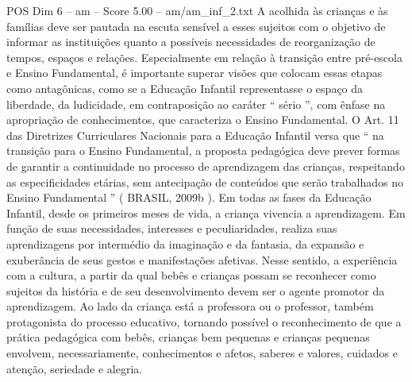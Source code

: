 \begin{textsample}{POS Dim 6 – am – Score 5.00 – am/am\_inf\_2.txt}
A acolhida às crianças e às famílias deve ser pautada na escuta sensível a esses sujeitos com o objetivo de informar as instituições quanto a possíveis necessidades de reorganização de tempos, espaços e relações.
Especialmente em relação à transição entre pré-escola e Ensino Fundamental, é importante superar visões que colocam essas etapas como antagônicas, como se a Educação Infantil representasse o espaço da liberdade, da ludicidade, em contraposição ao caráter “ sério ”, com ênfase na apropriação de conhecimentos, que caracteriza o Ensino Fundamental.
O Art. 11 das Diretrizes Curriculares Nacionais para a Educação Infantil versa que “ na transição para o Ensino Fundamental, a proposta pedagógica deve prever formas de garantir a continuidade no processo de aprendizagem das crianças, respeitando as especificidades etárias, sem antecipação de conteúdos que serão trabalhados no Ensino Fundamental ” ( BRASIL, 2009b ).
Em todas as fases da Educação Infantil, desde os primeiros meses de vida, a criança vivencia a aprendizagem.
Em função de suas necessidades, interesses e peculiaridades, realiza suas aprendizagens por intermédio da imaginação e da fantasia, da expansão e exuberância de seus gestos e manifestações afetivas.
Nesse sentido, a experiência com a cultura, a partir da qual bebês e crianças possam se reconhecer como sujeitos da história e de seu desenvolvimento devem ser o agente promotor da aprendizagem.
Ao lado da criança está a professora ou o professor, também protagonista do processo educativo, tornando possível o reconhecimento de que a prática pedagógica com bebês, crianças bem pequenas e crianças pequenas envolvem, necessariamente, conhecimentos e afetos, saberes e valores, cuidados e atenção, seriedade e alegria.

\end{textsample}
